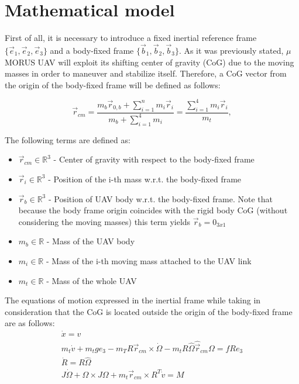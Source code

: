 \section{Mathematical model}

First of all, it is necessary to introduce a fixed inertial reference frame $\{ \vec{e}_1, \vec{e}_2, \vec{e}_3  \}$ and a body-fixed frame $ \{ \vec{b}_1, \vec{b}_2, \vec{b}_3 \}$. As it was previously stated, $\mu$MORUS UAV will exploit its shifting center of gravity (CoG) due to the moving masses in order to maneuver and stabilize itself. Therefore, a CoG vector from the origin of the body-fixed frame will be defined as follows:

\begin{equation}
	\vec{r}_{cm} = \frac{m_{b}\vec{r}_{0,b} + \sum_{i=1}^n m_{i}\vec{r}_{i}}{m_{b} + \sum_{i=1}^4 m_{i}} = \frac{\sum_{i=1}^4 m_{i}\vec{r}_{i}}{m_t},
	\label{equ:cog}
\end{equation}

The following terms are defined as: 
\begin{itemize}
	\item $\vec{r}_{cm} \in \mathbb{R}^3$ - Center of gravity with respect to the body-fixed frame
	
	\item $\vec{r}_{i} \in \mathbb{R}^3$ - Position of the i-th mass w.r.t. the body-fixed frame
	
	\item $\vec{r}_{b} \in \mathbb{R}^3$ - Position of UAV body w.r.t. the body-fixed frame. Note that because the body frame origin coincides with the rigid body CoG (without considering the moving masses) this term yields $\vec{r}_b = 0_{3x1}$
	
	\item $m_b \in \mathbb{R}$ - Mass of the UAV body 
	
	\item $m_i \in \mathbb{R}$ - Mass of the i-th moving mass attached to the UAV link
	
	\item $m_t \in \mathbb{R}$ - Mass of the whole UAV
\end{itemize}

The equations of motion expressed in the inertial frame while taking in consideration that the CoG is located outside the origin of the body-fixed frame\cite{LeeModel} are as follows: 
\begin{gather}
	\dot{x} = v \label{model1}\\
	m_t\dot{v} + m_tge_3 - m_TR \vec{r}_{cm} \times \dot{\Omega} - m_tR\hat{\Omega}\hat{\vec{r}}_{cm}\Omega = fRe_3 \label{model2} \\
	\dot{R} = R\hat{\Omega} \label{model3} \\
	J \dot{\Omega} + \Omega \times J \Omega + m_t \vec{r}_{cm} \times R^T \dot{v} = M \label{model4}
\end{gather}

